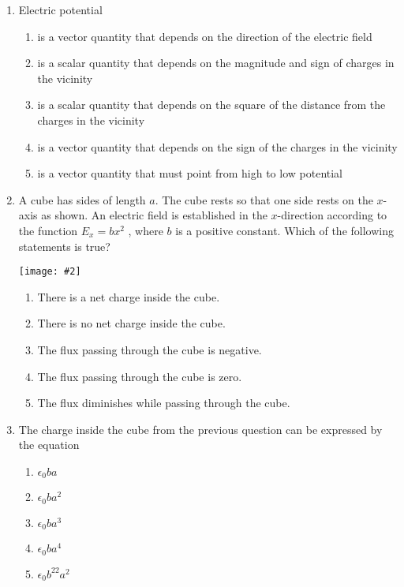 \documentclass[12pt]{article}
\newcommand{\pic}[2]{\texttt{[image: \#2]}}
\begin{document}
\begin{enumerate}[leftmargin=50pt,label=\underline{\hspace{0.4in}} \arabic*.]
\item Electric potential
  \begin{enumerate}[noitemsep,topsep=0pt,leftmargin=18pt,label=(\Alph*)]
  \item is a vector quantity that depends on the direction of the electric
    field
  \item is a scalar quantity that depends on the magnitude and sign of charges
    in the vicinity
  \item is a scalar quantity that depends on the square of the distance from
    the charges in the vicinity
  \item is a vector quantity that depends on the sign of the charges in the
    vicinity
  \item is a vector quantity that must point from high to low potential
  \end{enumerate}

\item A cube has sides of length $a$. The cube rests so that one side rests on
  the $x$-axis as shown. An electric field is established in the $x$-direction
  according to the function $E_x=bx^2$ , where $b$ is a positive constant.
  Which of the following statements is true?

  \hspace{-.7in}
  \begin{minipage}{.4\textwidth}
    \pic{1}{cube.png}
  \end{minipage}
  \begin{minipage}{.6\textwidth}
    \begin{enumerate}[noitemsep,topsep=0pt,leftmargin=18pt,label=(\Alph*)]
    \item There is a net charge inside the cube.
    \item There is no net charge inside the cube.
    \item The flux passing through the cube is negative.
    \item The flux passing through the cube is zero.
    \item The flux diminishes while passing through the cube.
    \end{enumerate}
  \end{minipage}

\item The charge inside the cube from the previous question can be expressed by
  the equation
  \begin{enumerate}[noitemsep,topsep=0pt,leftmargin=18pt,label=(\Alph*)]
  \item $\epsilon_0ba$
  \item $\epsilon_0ba^2$
  \item $\epsilon_0ba^3$
  \item $\epsilon_0ba^4$
  \item $\epsilon_0b^22a^2$
  \end{enumerate}


\end{enumerate}
\end{document}
